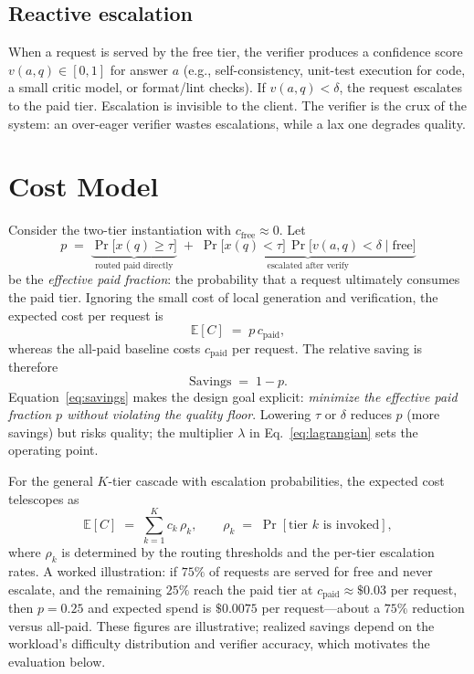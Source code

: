\documentclass[11pt]{article}
\newcommand{\cfree}{c_{\mathrm{free}}}
\newcommand{\cpaid}{c_{\mathrm{paid}}}
\begin{document}
\subsection{Reactive escalation}
When a request is served by the free tier, the verifier produces a confidence
score $v(a,q)\in[0,1]$ for answer $a$ (e.g., self-consistency, unit-test
execution for code, a small critic model, or format/lint checks). If
$v(a,q)<\delta$, the request escalates to the paid tier. Escalation is invisible
to the client. The verifier is the crux of the system: an over-eager verifier
wastes escalations, while a lax one degrades quality.

\section{Cost Model}
\label{sec:cost}
Consider the two-tier instantiation with $\cfree\approx0$. Let
\begin{equation}
p \;=\; \underbrace{\Pr\!\big[x(q)\ge\tau\big]}_{\text{routed paid directly}}
\;+\;
\underbrace{\Pr\!\big[x(q)<\tau\big]\,\Pr\!\big[v(a,q)<\delta \mid \text{free}\big]}_{\text{escalated after verify}}
\label{eq:p}
\end{equation}
be the \emph{effective paid fraction}: the probability that a request ultimately
consumes the paid tier. Ignoring the small cost of local generation and
verification, the expected cost per request is
\begin{equation}
\mathbb{E}[C] \;=\; p\,\cpaid ,
\label{eq:ecost}
\end{equation}
whereas the all-paid baseline costs $\cpaid$ per request. The relative saving is
therefore
\begin{equation}
\mathrm{Savings} \;=\; 1 - p .
\label{eq:savings}
\end{equation}
Equation~\eqref{eq:savings} makes the design goal explicit: \emph{minimize the
effective paid fraction $p$ without violating the quality floor}. Lowering
$\tau$ or $\delta$ reduces $p$ (more savings) but risks quality; the multiplier
$\lambda$ in Eq.~\eqref{eq:lagrangian} sets the operating point.

For the general $K$-tier cascade with escalation probabilities, the expected
cost telescopes as
\begin{equation}
\mathbb{E}[C] \;=\; \sum_{k=1}^{K} c_k \, \rho_k ,
\qquad
\rho_k \;=\; \Pr[\text{tier }k\text{ is invoked}],
\label{eq:kcost}
\end{equation}
where $\rho_k$ is determined by the routing thresholds and the per-tier
escalation rates. A worked illustration: if $75\%$ of requests are served for
free and never escalate, and the remaining $25\%$ reach the paid tier at
$\cpaid\!\approx\!\$0.03$ per request, then $p=0.25$ and expected spend is
$\$0.0075$ per request---about a $75\%$ reduction versus all-paid. These
figures are illustrative; realized savings depend on the workload's difficulty
distribution and verifier accuracy, which motivates the evaluation below.
\end{document}
